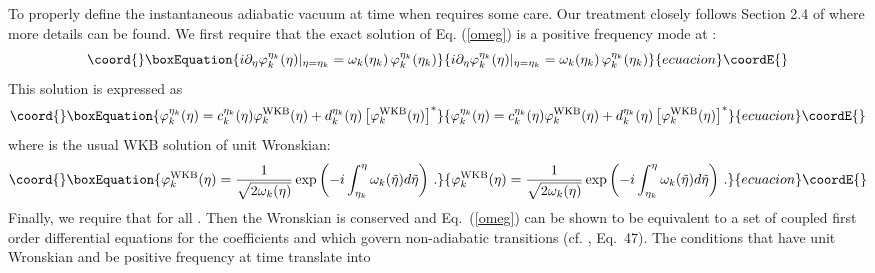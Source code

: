 \documentclass[a4paper,aps,prd,preprint,groupedaddress,nofootinbib]{revtex4}
\begin{document}
To properly define the instantaneous adiabatic vacuum \cite{BD84} 
at time \coordHE{} when \coordHE{} requires
some care. Our treatment closely follows Section 2.4 of \cite{MP98}
where more details can be found.  
We first require that the exact solution \coordHE{}
of Eq. (\ref{omeg}) is a positive frequency mode at \coordHE{}:
\begin{equation}\coord{}\boxEquation{
\label{varphidef}
i \partial_\eta \varphi_k^{\eta_k}(\eta)\vert_{\eta = \eta_k} =  
\omega_k(\eta_k) \,
\varphi_k^{\eta_k}(\eta_k)
}{
i \partial_\eta \varphi_k^{\eta_k}(\eta)\vert_{\eta = \eta_k} =  
\omega_k(\eta_k) \,
\varphi_k^{\eta_k}(\eta_k)
}{ecuacion}\coordE{}\end{equation}
This solution is expressed as   
\begin{equation}\coord{}\boxEquation{
\label{phiwkb}
\varphi_k^{\eta_k}(\eta) = c_k^{\eta_k}(\eta) \varphi_k^{\rm WKB}(\eta) +
d_k^{\eta_k}(\eta) \left[\varphi_k^{\rm WKB}(\eta)\right]^\ast
}{
\varphi_k^{\eta_k}(\eta) = c_k^{\eta_k}(\eta) \varphi_k^{\rm WKB}(\eta) +
d_k^{\eta_k}(\eta) \left[\varphi_k^{\rm WKB}(\eta)\right]^\ast
}{ecuacion}\coordE{}\end{equation}
where \coordHE{} is the usual WKB solution of unit Wronskian:
\begin{equation}\coord{}\boxEquation{
\label{WKB}
\varphi_k^{\rm WKB}(\eta) =  \frac{1}{\sqrt{2 \omega_k(\eta)}}
 \exp\left(-i  \int^\eta_{\eta_k} \omega_k(\tilde \eta) d\tilde
 \eta\right) \, .
}{
\varphi_k^{\rm WKB}(\eta) =  \frac{1}{\sqrt{2 \omega_k(\eta)}}
 \exp\left(-i  \int^\eta_{\eta_k} \omega_k(\tilde \eta) d\tilde
 \eta\right) \, .
}{ecuacion}\coordE{}\end{equation}
Finally, we require that \coordHE{}
for all \myHighlight{$\eta$}\coordHE{}. Then the Wronskian is conserved and Eq.~(\ref{omeg}) can be shown
to be equivalent to a set of coupled first order differential equations for
the coefficients \coordHE{} and \coordHE{}
which govern non-adiabatic transitions (cf. \cite{MP98}, Eq.~47). 
The conditions that \coordHE{} have 
unit Wronskian and be positive frequency at time \coordHE{} translate into 
\end{document}
